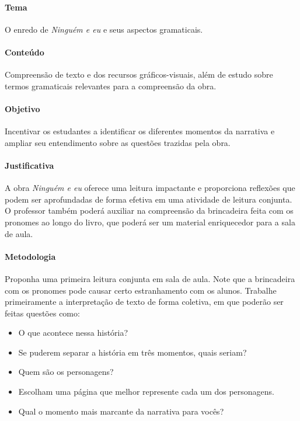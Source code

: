 \documentclass[11pt]{extarticle}
\begin{document}
\paragraph{Tema} O enredo de \textit{Ninguém e eu} e seus aspectos gramaticais.

\paragraph{Conteúdo} Compreensão de texto e dos recursos gráficos-visuais, além de estudo sobre termos gramaticais relevantes para a compreensão da obra.

\paragraph{Objetivo} Incentivar os estudantes a identificar os diferentes momentos da narrativa e ampliar seu entendimento sobre as questões trazidas pela obra.

\paragraph{Justificativa} A obra \textit{Ninguém e eu} oferece uma leitura impactante e proporciona reflexões que podem ser aprofundadas de forma efetiva em uma atividade de leitura conjunta. O professor também poderá auxiliar na compreensão da brincadeira feita com os pronomes ao longo do livro, que poderá ser um material enriquecedor para a sala de aula.

\paragraph{Metodologia} Proponha uma primeira leitura conjunta em sala de aula. Note que a brincadeira com os pronomes pode causar certo estranhamento com os alunos. Trabalhe primeiramente a interpretação de texto de forma coletiva, em que poderão ser feitas questões como:

\begin{itemize}

\item O que acontece nessa história? 

\item Se puderem separar a história em três momentos, quais seriam?

\item Quem são os personagens?

\item Escolham uma página que melhor represente cada um dos personagens.

\item Qual o momento mais marcante da narrativa para vocês?

\end{itemize}
\end{document}
